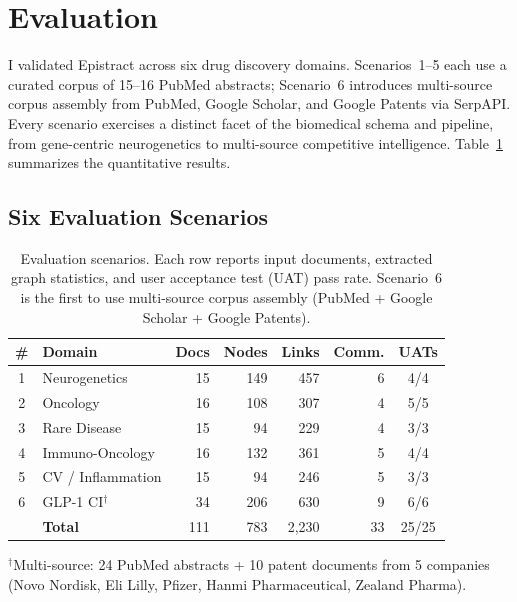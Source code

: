 \section{Evaluation}
\label{sec:evaluation}

I validated Epistract across six drug discovery domains. Scenarios~1--5 each use a curated corpus of 15--16 PubMed abstracts; Scenario~6 introduces multi-source corpus assembly from PubMed, Google Scholar, and Google Patents via SerpAPI.
Every scenario exercises a distinct facet of the biomedical schema and pipeline, from gene-centric neurogenetics to multi-source competitive intelligence.
Table~\ref{tab:scenarios} summarizes the quantitative results.

\subsection{Six Evaluation Scenarios}

\begin{table}[t]
\centering
\small
\caption{Evaluation scenarios. Each row reports input documents, extracted graph statistics, and user acceptance test (UAT) pass rate. Scenario~6 is the first to use multi-source corpus assembly (PubMed + Google Scholar + Google Patents).}
\label{tab:scenarios}
\begin{tabular}{@{}clrrrrc@{}}
\toprule
\textbf{\#} & \textbf{Domain} & \textbf{Docs} & \textbf{Nodes} & \textbf{Links} & \textbf{Comm.} & \textbf{UATs} \\
\midrule
1 & Neurogenetics       & 15 & 149 & 457 & 6 & 4/4 \\
2 & Oncology            & 16 & 108 & 307 & 4 & 5/5 \\
3 & Rare Disease        & 15 &  94 & 229 & 4 & 3/3 \\
4 & Immuno-Oncology     & 16 & 132 & 361 & 5 & 4/4 \\
5 & CV / Inflammation   & 15 &  94 & 246 & 5 & 3/3 \\
6 & GLP-1 CI$^\dagger$  & 34 & 206 & 630 & 9 & 6/6 \\
\midrule
  & \textbf{Total}      & 111 & 783 & 2{,}230 & 33 & 25/25 \\
\bottomrule
\end{tabular}
\vspace{2pt}
{\footnotesize $^\dagger$Multi-source: 24 PubMed abstracts + 10 patent documents from 5 companies (Novo Nordisk, Eli Lilly, Pfizer, Hanmi Pharmaceutical, Zealand Pharma).}
\end{table}

